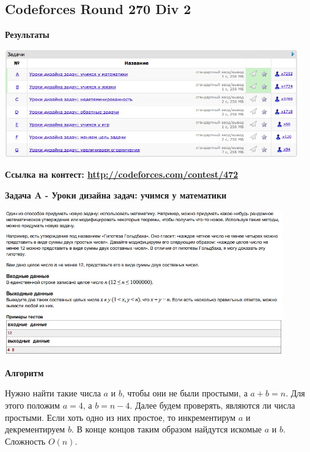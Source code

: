 \documentclass[a4paper,12pt]{article}
\begin{document}
%
%

\newpage
\subsection{Codeforces Round 270 Div 2}

\textbf{{\large Результаты}} \\
\begin{center}
\includegraphics[width=0.95\textwidth]{C_270/A_C_270_result.png}\\ [1cm]
\end{center}

\textbf{{\large Ссылка на контест: \url{http://codeforces.com/contest/472}}}

\newpage
\textbf{{\large Задача A - Уроки дизайна задач: учимся у математики}} \\
\begin{center}
\includegraphics[width=0.9\textwidth]{C_270/C_270_A.png}\\ [1cm]
\end{center}

\textbf{{\large Алгоритм}}

Нужно найти такие числа $a$ и $b$, чтобы они не были простыми, а $a + b = n$. Для этого положим $a = 4$, а $b = n - 4$. Далее будем проверять, являются ли числа простыми. Если хоть одно из них простое, то инкрементирум $a$ и декрементируем $b$. В конце концов таким образом найдутся искомые $a$ и $b$. Сложность $O(n)$.\\
\end{document}
